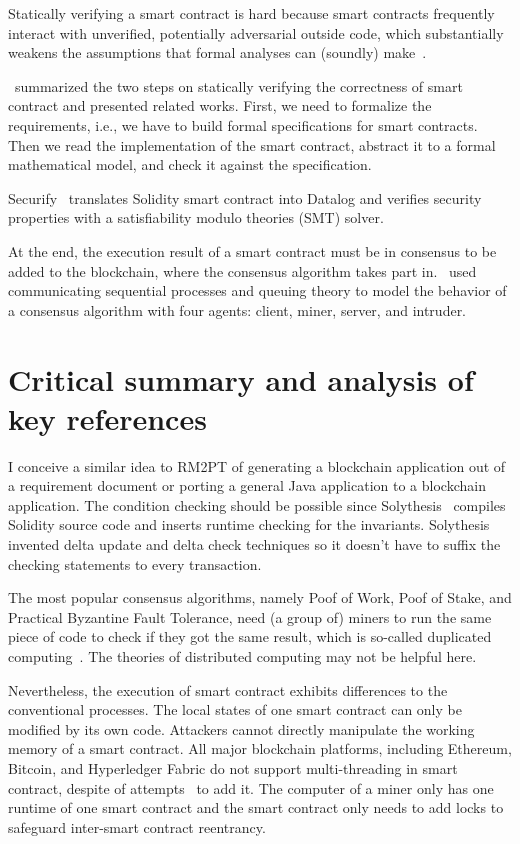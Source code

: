 Statically verifying a smart contract is hard because
smart contracts frequently interact with unverified, potentially adversarial outside code, which substantially weakens the assumptions that formal analyses can (soundly) make~\cite{bram2021rich}.

\cite{tolmach2021survey}~summarized the two steps on statically verifying the correctness of smart contract and presented related works.
First, we need to formalize the requirements, i.e., we have to build formal specifications for smart contracts.
Then we read the implementation of the smart contract, abstract it to a formal mathematical model, and check it against the specification.

Securify~\cite{tsankov2018securify} translates Solidity smart contract into Datalog and verifies security properties with a satisfiability modulo theories (SMT) solver.



At the end, the execution result of a smart contract must be in consensus to be added to the blockchain, where the consensus algorithm takes part in.
\cite{altarawneh2021availability}~used communicating sequential processes and queuing theory to model the behavior of a consensus algorithm with four agents: client, miner, server, and intruder.





\section{Critical summary and analysis of key references}


I conceive a similar idea to RM2PT of generating a blockchain application out of a requirement document or porting a general Java application to a blockchain application. The condition checking should be possible since Solythesis~\cite{li2020securing} compiles Solidity source code and inserts runtime checking for the invariants. Solythesis invented delta update and delta check techniques so it doesn't have to suffix the checking statements to every transaction.

The most popular consensus algorithms, namely Poof of Work, Poof of Stake, and Practical Byzantine Fault Tolerance, need (a group of) miners to run the same piece of code to check if they got the same result, which is so-called duplicated computing~\cite{shae2018transform}. The theories of distributed computing may not be helpful here.

Nevertheless, the execution of smart contract exhibits differences to the conventional processes.
The local states of one smart contract can only be modified by its own code. Attackers cannot directly manipulate the working memory of a smart contract.
All major blockchain platforms, including Ethereum, Bitcoin, and Hyperledger Fabric do not support multi-threading in smart contract, despite of attempts~\cite{anjana2019efficient,yu2018parallel} to add it. The computer of a miner only has one runtime of one smart contract and the smart contract only needs to add locks to safeguard inter-smart contract reentrancy.

